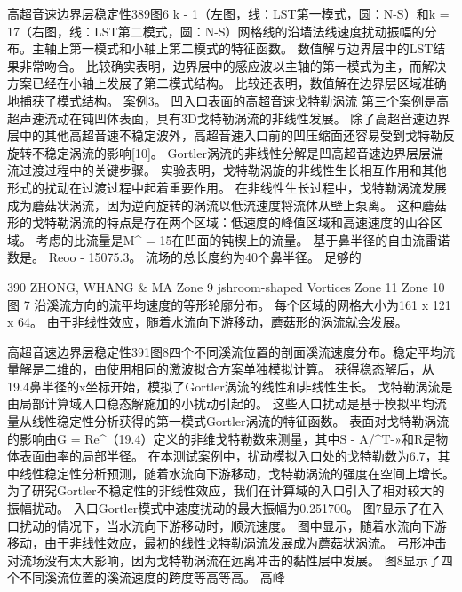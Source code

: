 \documentclass[UTF8,11pt,a4paper,openany,fontset=fandol]{ctexbook}
\begin{document}
高超音速边界层稳定性389图6 k - 1（左图，线：LST第一模式，圆：N-S）和k = 17（右图，线：LST第二模式，圆：N-S）网格线的沿墙法线速度扰动振幅的分布。主轴上第一模式和小轴上第二模式的特征函数。 数值解与边界层中的LST结果非常吻合。 比较确实表明，边界层中的感应波以主轴的第一模式为主，而解决方案已经在小轴上发展了第二模式结构。 比较还表明，数值解在边界层区域准确地捕获了模式结构。 案例3。 凹入口表面的高超音速戈特勒涡流 第三个案例是高超声速流动在钝凹体表面，具有3D戈特勒涡流的非线性发展。 除了高超音速边界层中的其他高超音速不稳定波外，高超音速入口前的凹压缩面还容易受到戈特勒反旋转不稳定涡流的影响[10]。 Gortler涡流的非线性分解是凹高超音速边界层层湍流过渡过程中的关键步骤。 实验表明，戈特勒涡旋的非线性生长相互作用和其他形式的扰动在过渡过程中起着重要作用。 在非线性生长过程中，戈特勒涡流发展成为蘑菇状涡流，因为逆向旋转的涡流以低流速度将流体从壁上泵离。 这种蘑菇形的戈特勒涡流的特点是存在两个区域：低速度的峰值区域和高速速度的山谷区域。 考虑的比流量是M\textasciicircum{} = 15在凹面的钝楔上的流量。 基于鼻半径的自由流雷诺数是。 Reoo - 15075.3。 流场的总长度约为40个鼻半径。 足够的

390 ZHONG, WHANG \& MA Zone 9 jshroom-shaped Vortices Zone 11 Zone 10 图 7 沿溪流方向的流平均速度的等形轮廓分布。 每个区域的网格大小为161 x 121 x 64。 由于非线性效应，随着水流向下游移动，蘑菇形的涡流就会发展。

高超音速边界层稳定性391图8四个不同溪流位置的剖面溪流速度分布。稳定平均流量解是二维的，由使用相同的激波拟合方案单独模拟计算。 获得稳态解后，从19.4鼻半径的x坐标开始，模拟了Gortler涡流的线性和非线性生长。 戈特勒涡流是由局部计算域入口稳态解施加的小扰动引起的。 这些入口扰动是基于模拟平均流量从线性稳定性分析获得的第一模式Gortler涡流的特征函数。 表面对戈特勒涡流的影响由G = Re\textasciicircum{}（19.4）定义的非维戈特勒数来测量，其中S - A/\textasciicircum{}T-»和R是物体表面曲率的局部半径。 在本测试案例中，扰动模拟入口处的戈特勒数为6.7，其中线性稳定性分析预测，随着水流向下游移动，戈特勒涡流的强度在空间上增长。 为了研究Gortler不稳定性的非线性效应，我们在计算域的入口引入了相对较大的振幅扰动。 入口Gortler模式中速度扰动的最大振幅为0.251700。 图7显示了在入口扰动的情况下，当水流向下游移动时，顺流速度。 图中显示，随着水流向下游移动，由于非线性效应，最初的线性戈特勒涡流发展成为蘑菇状涡流。 弓形冲击对流场没有太大影响，因为戈特勒涡流在远离冲击的黏性层中发展。 图8显示了四个不同溪流位置的溪流速度的跨度等高等高。 高峰
\end{document}
